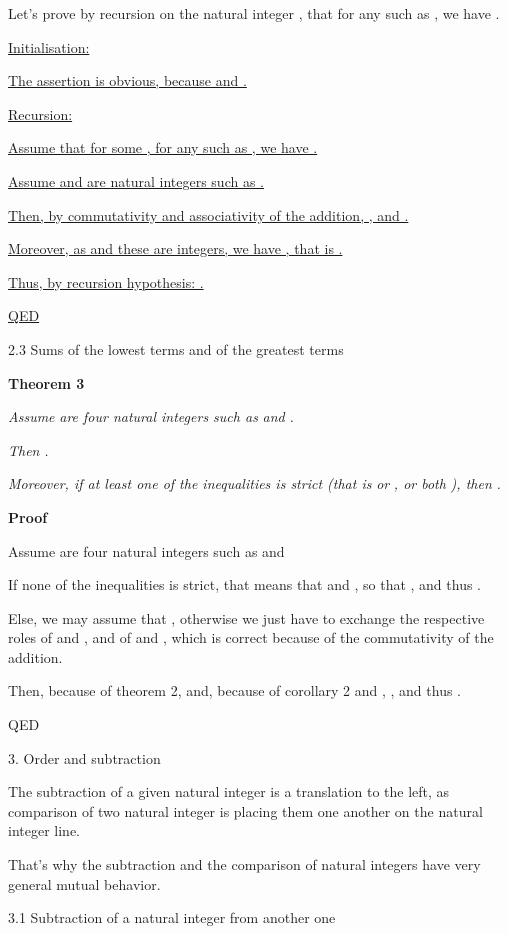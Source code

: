 \documentclass{article}
\begin{document}
Let’s prove by recursion on the natural integer , that for any  such as , we have .

\ul{Initialisation}\ul{: }

\ul{The assertion is obvious, because }\ul{ and }\ul{.}

\ul{Recursion}\ul{: }

\ul{Assume that for some }\ul{, for any }\ul{ such as }\ul{, we have }\ul{.}

\ul{Assume }\ul{ and }\ul{ are natural integers such as }\ul{.}

\ul{Then, by commutativity and associativity of the addition, }\ul{, and }\ul{.}

\ul{Moreover, as }\ul{ and these are integers, we have }\ul{, that is }\ul{.}

\ul{Thus, by recursion hypothesis: }\ul{.}

\ul{QED}



2.3 Sums of the lowest terms and of the greatest terms

\textbf{Theorem 3}

\emph{Assume }\emph{ are four natural integers such as }\emph{ and }\emph{. }

\emph{Then }\emph{.}

\emph{Moreover, if at least one of the inequalities is strict (that is }\emph{ or }\emph{, or both }\emph{), then }\emph{.}

\textbf{Proof}

Assume  are four natural integers such as  and 

If none of the inequalities is strict, that means that  and , so that , and thus .

Else, we may assume that , otherwise we just have to exchange the respective roles of  and , and of  and , which is correct because of the commutativity of the addition.

Then, because of theorem 2,  and, because of corollary 2 and , , and thus .

QED

3. Order and subtraction

The subtraction of a given natural integer is a translation to the left, as comparison of two natural integer is placing them one another on the natural integer line.

That’s why the subtraction and the comparison of natural integers have very general mutual behavior.



3.1 Subtraction of a natural integer from another one
\end{document}
